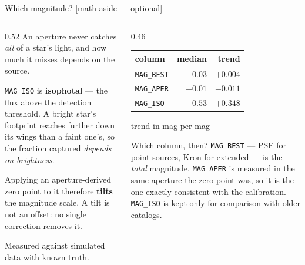 \documentclass[10pt,aspectratio=169]{beamer}
\newcommand{\asidetag}{\hfill{\footnotesize\color{cassablue}[math aside --- optional]}}
\begin{document}
\begin{frame}{Which magnitude? \asidetag}
  \begin{columns}[T]
    \begin{column}{0.52\textwidth}
      An aperture never catches \emph{all} of a star's light, and how much it
      misses depends on the source.

      \medskip
      \texttt{MAG\_ISO} is \textbf{isophotal} --- the flux above the detection
      threshold. A bright star's footprint reaches further down its wings than a
      faint one's, so the fraction captured \emph{depends on brightness}.

      \medskip
      Applying an aperture-derived zero point to it therefore \textbf{tilts} the
      magnitude scale. A tilt is not an offset: no single correction removes it.

      \medskip
      {\footnotesize Measured against simulated data with known truth.}
    \end{column}
    \begin{column}{0.46\textwidth}
      \centering
      {\footnotesize
      \begin{tabular}{lrr}
        \toprule
        column & median & trend \\
        \midrule
        \texttt{MAG\_BEST} & $+0.03$ & $+0.004$ \\
        \texttt{MAG\_APER} & $-0.01$ & $-0.011$ \\
        \texttt{MAG\_ISO}  & $+0.53$ & $\mathbf{+0.348}$ \\
        \bottomrule
      \end{tabular}
      \par\medskip
      trend in mag per mag
      }

      \vspace{1em}
      \begin{block}{\small Which column, then?}
        \footnotesize \texttt{MAG\_BEST} --- PSF for point sources, Kron for extended --- is
        the \emph{total} magnitude. \texttt{MAG\_APER} is measured in the same aperture the
        zero point was, so it is the one exactly consistent with the calibration.
        \texttt{MAG\_ISO} is kept only for comparison with older catalogs.
      \end{block}
    \end{column}
  \end{columns}
\end{frame}
\end{document}
